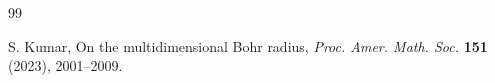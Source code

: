 \documentclass[a4paper,12pt]{amsart}
\theoremstyle{definition}
\begin{document}
\begin{thebibliography}{99}
	
	
	
	
	
	
	
	
	
	
	 {\sc S. Kumar}, On the multidimensional Bohr radius, {\it Proc. Amer. Math. Soc.} {\bf 151} (2023), 2001--2009.
	

\end{thebibliography}
\end{document}
